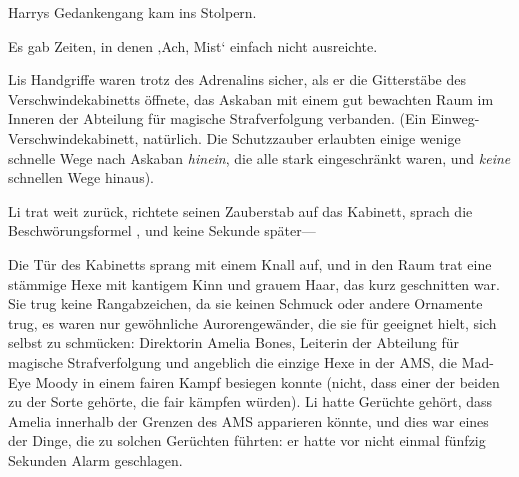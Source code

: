 Harrys Gedankengang kam ins Stolpern.

Es gab Zeiten, in denen ‚Ach, Mist‘ einfach nicht ausreichte.

\later

Lis Handgriffe waren trotz des Adrenalins sicher, als er die Gitterstäbe des Verschwindekabinetts öffnete, das Askaban mit einem gut bewachten Raum im Inneren der Abteilung für magische Strafverfolgung verbanden. (Ein Einweg-Verschwindekabinett, natürlich. Die Schutzzauber erlaubten einige wenige schnelle Wege nach Askaban \emph{hinein}, die alle stark eingeschränkt waren, und \emph{keine} schnellen Wege hinaus).

Li trat weit zurück, richtete seinen Zauberstab auf das Kabinett, sprach die Beschwörungsformel , und keine Sekunde später—

Die Tür des Kabinetts sprang mit einem Knall auf, und in den Raum trat eine stämmige Hexe mit kantigem Kinn und grauem Haar, das kurz geschnitten war. Sie trug keine Rangabzeichen, da sie keinen Schmuck oder andere Ornamente trug, es waren nur gewöhnliche Aurorengewänder, die sie für geeignet hielt, sich selbst zu schmücken: Direktorin Amelia Bones, Leiterin der Abteilung für magische Strafverfolgung und angeblich die einzige Hexe in der AMS, die Mad-Eye Moody in einem fairen Kampf besiegen konnte (nicht, dass einer der beiden zu der Sorte gehörte, die fair kämpfen würden). Li hatte Gerüchte gehört, dass Amelia innerhalb der Grenzen des AMS apparieren könnte, und dies war eines der Dinge, die zu solchen Gerüchten führten: er hatte vor nicht einmal fünfzig Sekunden Alarm geschlagen.

